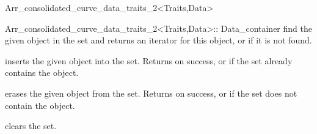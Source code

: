 \begin{ccRefClass}{Arr_consolidated_curve_data_traits_2<Traits,Data>}
\begin{ccClass}{Arr_consolidated_curve_data_traits_2<Traits,Data>::
                Data_container}
  {find the given  object in the set and returns an iterator
   for this object, or  if it is not found.}

\ccModifiers

  {inserts the given  object into the set. Returns  on
   success, or  if the set already contains the object.}

  {erases the given  object from the set. Returns  on
   success, or  if the set does not contain the object.}

  {clears the set.}

\end{ccClass}

\end{ccRefClass}

\ccRefPageEnd
